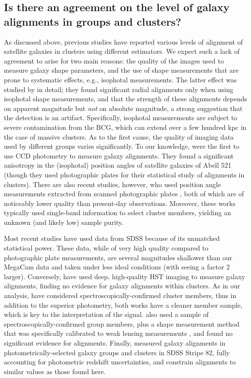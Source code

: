 \subsection{Is there an agreement on the level of galaxy alignments in groups and clusters?}
\label{s:agreement}

As discussed above, previous studies have reported various levels of alignment of satellite 
galaxies in clusters using different estimators. We expect such a lack of agreement to arise for 
two main reasons: the quality of the images used to measure galaxy shape parameters, and the use of 
shape measurements that are prone to systematic effects, e.g., isophotal measurements. The latter 
effect was studied by \cite{hao11} in detail; they found significant radial alignments only when 
using isophotal shape measurements, and that the strength of these alignments depends on apparent 
magnitude but \textit{not} on absolute magnitude, a strong suggestion that the detection is an 
artifact. Specifically, isophotal measurements are subject to severe contamination from the BCG, 
which can extend over a few hundred kpc in the case of massive clusters. As to the first cause, the 
quality of imaging data used by different groups varies significantly. To our knowledge, 
\cite{plionis03} were the first to use CCD photometry to measure galaxy alignments. They found a 
significant anisotropy in the (isophotal) position angles of satellite galaxies of Abell 521 
(though 
they used photographic plates for their statistical study of alignments in clusters). There are 
also 
recent studies, however, who used position angle measurements extracted from scanned photographic 
plates \citep[e.g.,][]{baier03,panko09,godlowski10}, both of which are of noticeably lower 
quality than present-day observations. Moreover, these works typically used single-band information 
to select cluster members, yielding an unknown (and likely low) sample purity.

Most recent studies have used data from SDSS because of its unmatched statistical power. 
These data, while of very high quality compared to photographic plate measurements, are several 
magnitudes shallower than our MegaCam data and taken under less ideal conditions (with seeing a 
factor 2 larger). Conversely, \cite{hung12} have used deep, high-quality HST imaging to measure 
galaxy alignments, finding no evidence for galaxy alignments within clusters. As in our analysis, 
\cite{hung12} have considered spectroscopically-confirmed cluster members, thus in addition to the 
superior photometry, both works have a cleaner member sample, which is key to the interpretation of 
the signal. \cite{schneider13} also used a sample of spectroscopically-confirmed group members, 
plus a shape measurement method that was specifically calibrated to weak lensing measurements 
\citep{mandelbaum05_errors}, and found no significant evidence for alignments. 
Finally, \cite{chisari14} 
measured galaxy alignments in photometrically-selected galaxy groups and clusters in SDSS Stripe 
82, fully accounting for photometric redshift uncertainties, and constrain alignments to similar 
values as those found here.

